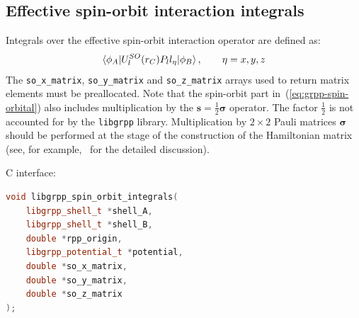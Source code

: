 \documentclass[12pt]{article}
\begin{document}
\subsection{Effective spin-orbit interaction integrals}

Integrals over the effective spin-orbit interaction operator are defined as:
%
\begin{equation}
\braket{\phi_A|U^{SO}_l(r_C) P_l l_\eta|\phi_B}, \quad\quad \eta=x,y,z
\label{eq:def-so-ints}
\end{equation}
%
The \texttt{so\_x\_matrix}, \texttt{so\_y\_matrix} and \texttt{so\_z\_matrix} arrays used to return matrix elements must be preallocated. Note that the spin-orbit part in~(\ref{eq:grpp-spin-orbital}) also includes multiplication by the $ \bm{s} = \frac{1}{2}\bm{\sigma}$ operator. The factor $\frac{1}{2}$ is not accounted for by the \texttt{libgrpp} library. Multiplication by $2 \times 2$ Pauli matrices $\bm{\sigma}$ should be performed at the stage of the construction of the Hamiltonian matrix (see, for example,~\cite{Wuellen:10} for the detailed discussion).

C interface:
\begin{lstlisting}[language=C++]
void libgrpp_spin_orbit_integrals(
    libgrpp_shell_t *shell_A,
    libgrpp_shell_t *shell_B,
    double *rpp_origin,
    libgrpp_potential_t *potential,
    double *so_x_matrix,
    double *so_y_matrix,
    double *so_z_matrix
);
\end{lstlisting}
\end{document}
